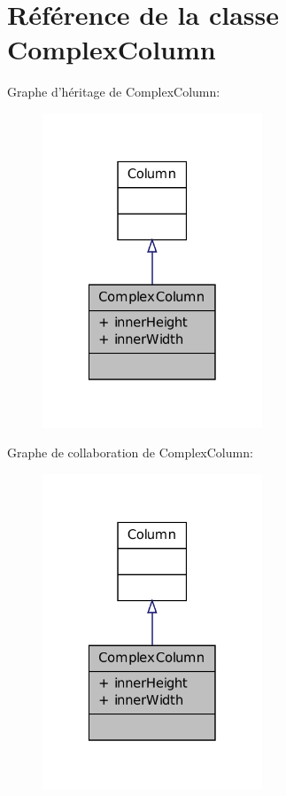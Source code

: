 \hypertarget{classComplexColumn}{\section{Référence de la classe Complex\-Column}
\label{classComplexColumn}
}


Graphe d'héritage de Complex\-Column\-:
\nopagebreak
\begin{figure}[H]
\begin{center}
\leavevmode
\includegraphics[width=186pt]{classComplexColumn__inherit__graph}
\end{center}
\end{figure}


Graphe de collaboration de Complex\-Column\-:
\nopagebreak
\begin{figure}[H]
\begin{center}
\leavevmode
\includegraphics[width=186pt]{classComplexColumn__coll__graph}
\end{center}
\end{figure}
